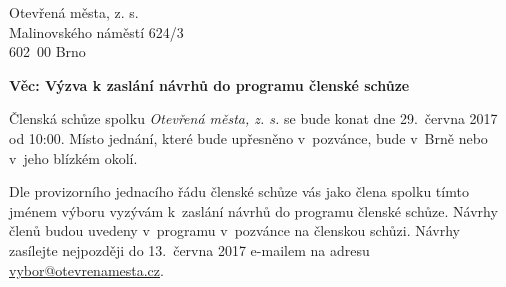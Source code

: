 \documentclass[a4paper,12pt]{letter}
\begin{document}
\pagestyle{empty}
\begin{letter}{}{}
\begin{flushleft}
Otevřená města, z. s.\\ Malinovského náměstí 624/3\\ 602\ 00 Brno
\end{flushleft}
\date{V Brně dne 29.\ května 2017}

\opening{\textbf{Věc: Výzva k zaslání návrhů do programu členské schůze}}

Členská schůze spolku \emph{Otevřená města, z. s.} se bude konat dne 29.\ června
2017 od 10:00. Místo jednání, které bude upřesněno v~pozvánce, bude v~Brně nebo
v~jeho blízkém okolí.

\sloppy
Dle provizorního jednacího řádu členské schůze vás jako člena spolku tímto
jménem výboru vyzývám k~zaslání návrhů do programu členské schůze. Návrhy členů
budou uvedeny v~programu v~pozvánce na členskou schůzi. Návrhy zasílejte
nejpozději do 13.\ června 2017 e-mailem na adresu
\href{mailto:vybor@otevrenamesta.cz}{vybor@otevrenamesta.cz}.

\fussy
\vspace{0.1\textwidth}
\begin{flushright}
\\
\\
\\
\end{flushright}
\end{letter}
\end{document}

